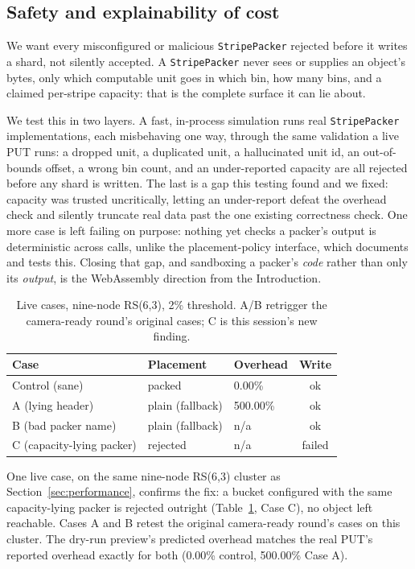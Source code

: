 \documentclass[10pt,conference]{IEEEtran}
\begin{document}
\subsection{Safety and explainability of cost}
\label{sec:safety}

We want every misconfigured or malicious \texttt{StripePacker} rejected
before it writes a shard, not silently accepted. A \texttt{StripePacker}
never sees or supplies an
object's bytes, only which computable unit goes in which bin, how many
bins, and a claimed per-stripe capacity: that is the complete surface it
can lie about.

We test this in two layers. A fast, in-process simulation runs real
\texttt{StripePacker} implementations, each misbehaving one way,
through the same validation a live PUT runs: a
dropped unit, a duplicated unit, a hallucinated unit id, an
out-of-bounds offset, a wrong bin count, and an under-reported capacity
are all rejected before any shard is written. The last is a gap this
testing found and we fixed: capacity was trusted uncritically, letting
an under-report defeat the overhead check and silently truncate real
data past the one existing correctness check. One more case is left
failing on purpose: nothing yet checks a packer's output is
deterministic across calls, unlike the placement-policy interface,
which documents and tests this. Closing that gap, and sandboxing a
packer's \emph{code} rather than only its \emph{output}, is the
WebAssembly direction from the Introduction.

\begin{table}[t]
\centering
\scriptsize
\setlength{\tabcolsep}{3pt}
\begin{tabular}{@{}lllc@{}}
\toprule
Case & Placement & Overhead & Write \\
\midrule
Control (sane) & packed & 0.00\% & ok \\
A (lying header) & plain (fallback) & 500.00\% & ok \\
B (bad packer name) & plain (fallback) & n/a & ok \\
C (capacity-lying packer) & rejected & n/a & failed \\
\bottomrule
\end{tabular}
\caption{Live cases, nine-node RS(6,3), 2\% threshold. A/B retrigger the
camera-ready round's original cases; C is this session's new finding.}
\label{tab:adversarial}
\end{table}

One live case, on the same nine-node RS(6,3) cluster as
Section~\ref{sec:performance}, confirms the fix: a bucket configured
with the same capacity-lying packer is rejected outright
(Table~\ref{tab:adversarial}, Case C), no object left reachable. Cases
A and B retest the original camera-ready round's cases on this cluster.
The dry-run preview's predicted overhead matches the real PUT's
reported overhead exactly for both (0.00\% control, 500.00\% Case A).
\end{document}
